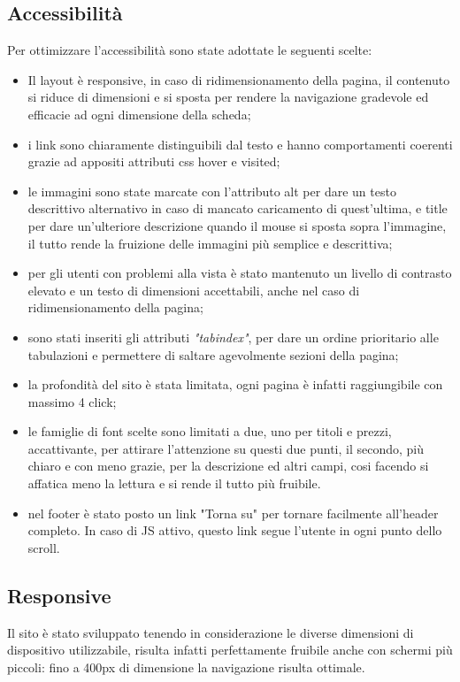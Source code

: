 \subsection{Accessibilità}
Per ottimizzare l'accessibilità sono state adottate le seguenti scelte:
\begin{itemize}
	\item Il layout è responsive, in caso di ridimensionamento della pagina, il contenuto si riduce di dimensioni e si sposta per rendere la navigazione gradevole ed efficacie ad ogni dimensione della scheda;
	\item i link sono chiaramente distinguibili dal testo e hanno comportamenti coerenti grazie ad appositi attributi css hover e visited;
	\item le immagini sono state marcate con l'attributo alt per dare un testo descrittivo alternativo in caso di mancato caricamento di quest'ultima, e title per dare un'ulteriore descrizione quando il mouse si sposta sopra l'immagine, il tutto rende la fruizione delle immagini più semplice e descrittiva;
	\item per gli utenti con problemi alla vista è stato mantenuto un livello di contrasto elevato e un testo di dimensioni accettabili, anche nel caso di ridimensionamento della pagina;
	\item sono stati inseriti gli attributi \textit{"tabindex"}, per dare un ordine prioritario alle tabulazioni e permettere di saltare agevolmente sezioni della pagina;
	\item la profondità del sito è stata limitata, ogni pagina è infatti raggiungibile con massimo 4 click;
	\item le famiglie di font scelte sono limitati a due, uno per titoli e prezzi, accattivante, per attirare l'attenzione su questi due punti, il secondo, più chiaro e con meno grazie, per la descrizione ed altri campi, cosi facendo si affatica meno la lettura e si rende il tutto più fruibile.
	\item nel footer è stato posto un link "Torna su" per tornare facilmente all'header completo. In caso di JS attivo, questo link segue l'utente in ogni punto dello scroll. 
\end{itemize}
\subsection{Responsive}

Il sito è stato sviluppato tenendo in considerazione le diverse dimensioni di dispositivo utilizzabile, risulta infatti perfettamente fruibile anche con schermi più piccoli: fino a 400px di dimensione la navigazione risulta ottimale.

